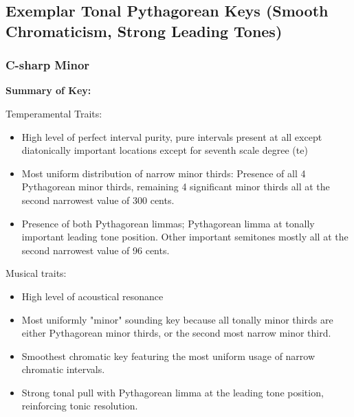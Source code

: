     \subsection{Exemplar Tonal Pythagorean Keys (Smooth Chromaticism, Strong
Leading
Tones)}\label{exemplar-tonal-pythagorean-keys-smooth-chromaticism-strong-leading-tones}

    \subsubsection{C-sharp Minor}\label{c-sharp-minor}

\textbf{Summary of Key:}


    \begin{center}
    \end{center}
    
    Temperamental Traits:

\begin{itemize}
\tightlist
\item
  High level of perfect interval purity, pure intervals present at all
  except diatonically important locations except for seventh scale
  degree (te)
\item
  Most uniform distribution of narrow minor thirds: Presence of all 4
  Pythagorean minor thirds, remaining 4 significant minor thirds all at
  the second narrowest value of 300 cents.
\item
  Presence of both Pythagorean limmas; Pythagorean limma at tonally
  important leading tone position. Other important semitones mostly all
  at the second narrowest value of 96 cents.
\end{itemize}

Musical traits:

\begin{itemize}
\tightlist
\item
  High level of acoustical resonance
\item
  Most uniformly "minor" sounding key because all tonally minor thirds
  are either Pythagorean minor thirds, or the second most narrow minor
  third.
\item
  Smoothest chromatic key featuring the most uniform usage of narrow
  chromatic intervals.
\item
  Strong tonal pull with Pythagorean limma at the leading tone position,
  reinforcing tonic resolution.
\end{itemize}

